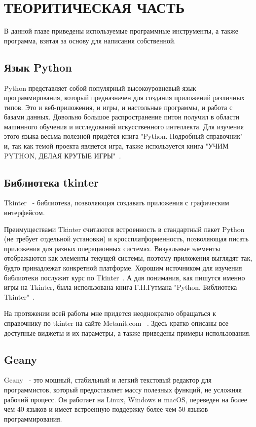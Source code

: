 \chapter{\label{ch:ch01}ТЕОРИТИЧЕСКАЯ ЧАСТЬ}
В данной главе приведены используемые программные инструменты, а также программа, взятая за основу для написания собственной.

\section{\label{sec:ch01/sec01}Язык Python}
Python представляет собой популярный высокоуровневый язык программирования, который предназначен для создания приложений различных типов. Это и веб-приложения, и игры, и настольные программы, и работа с базами данных. Довольно большое распространение питон получил в области машинного обучения и исследований искусственного интеллекта.
Для изучения этого языка весьма полезной придётся книга "Python. Подробный справочник"~\cite{book-Python} и, так как темой проекта является игра, также используется книга "УЧИМ PYTHON, ДЕЛАЯ КРУТЫЕ ИГРЫ"~\cite{book-Python_2}.


\section{\label{sec:ch01/sec02}Библиотека tkinter}
Tkinter~\cite{Python-tkinter} - библиотека, позволяющая создавать приложения с графическим интерфейсом.

Преимуществами Tkinter считаются встроенность в стандартный пакет Python (не требует отдельной установки) и кроссплатформенность, позволяющая писать приложения для разных операционных системах. Визуальные элементы отображаются как элементы текущей системы, поэтому приложения выглядят так, будто принадлежат конкретной платформе. Хорошим источником для изучения библиотеки послужит курс по Tkinter~\cite{Course-tkinter}. А для понимания, как пишутся именно игры на Tkinter, была использована книга Г.Н.Гутмана "Python. Библиотека Tkinter"~\cite{book-tkinter-games}.

На протяжении всей работы мне придется неоднократно  обращаться к справочнику по tkinter на сайте Metanit.com ~\cite{tkinter-manual}. Здесь кратко описаны все доступные виджеты и их параметры, а также приведены примеры использования.

\section{\label{sec:ch01/sec02}Geany}
Geany~\cite{geany} - это мощный, стабильный и легкий текстовый редактор для программистов, который предоставляет массу полезных функций, не усложняя рабочий процесс. Он работает на Linux, Windows и macOS, переведен на более чем 40 языков и имеет встроенную поддержку более чем 50 языков программирования.

